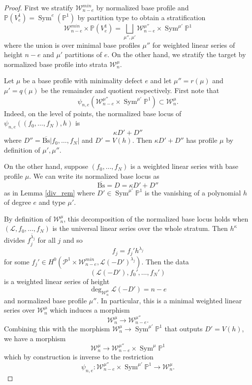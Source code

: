 \documentclass[a4paper,12pt]{amsart}
\theoremstyle{definition}
\newcommand{\bP}{\mathbb{P}}
\newcommand{\cL}{\mathcal{L}}
\newcommand{\cW}{\mathcal{W}}
\newcommand{\cP}{\mathcal{P}}
\DeclareMathOperator{\Sym}{Sym}
\begin{document}
	\begin{proof} First we stratify $\cW_{n-e}^{min}$ by normalized base profile and $\bP(V_e^1) = \Sym^e(\bP^1)$ by partition type to obtain a stratification 
		$$
		\cW_{n-e}^{min} \times \bP(V_e^1) = \bigsqcup_{\mu'',\mu'} \cW_{n-e}^{\mu''} \times \Sym^{\mu'}\bP^1
		$$
		where the union is over minimal base profiles $\mu''$ for weighted linear series of height $n-e$ and $\mu'$ partitions of $e$. On the other hand, we stratify the target by normalized base profile into strata $\cW_n^{\mu}$. 
		
		Let $\mu$ be a base profile with minimality defect $e$ and let $\mu'' = r(\mu)$ and $\mu' = q(\mu)$ be the remainder and quotient respectively. First note that 
		$$
		\psi_{n,e}(\cW_{n-e}^{\mu''} \times \Sym^{\mu'}\bP^1) \subset \cW^{\mu}_n. 
		$$
		Indeed, on the level of points, the normalized base locus of $\psi_{n,e}((f_0, \ldots,f_N),h)$ is
		$$
		\kappa D' + D''
		$$
		where $D'' = \overline{\mathrm{Bs}}|f_0, \ldots, f_N|$ and $D' = V(h)$. Then $\kappa D' + D''$ has profile $\mu$ by definition of $\mu', \mu''$.  
		
		On the other hand, suppose $(f_0, \ldots, f_N)$ is a weighted linear series with base profile $\mu$. We can write its normalized base locus as
		$$
		\overline{\mathrm{Bs}} = D = \kappa D' + D''
		$$
		as in Lemma \ref{div_rem} where $D' \in \Sym^{\mu'}\bP^1$ is the vanishing of a polynomial $h$ of degree $e$ and type $\mu'$. 
		
		By definition of $\cW^\mu_n$, this decomposition of the normalized base locus holds when $(\cL, f_0, \ldots, f_N)$ is the universal linear series over the whole stratum. Then $h^{\kappa}$ divides $f_j^{\bar{\lambda}_j}$ for all $j$ and so 
		$$
		f_j = f_j'h^{\lambda_j}
		$$
		for some $f_j' \in H^0(\cP^1 \times \cW^{min}_{n-e}, \cL(-D')^{\lambda_j})$. Then the data
		$$
		(\cL(-D'), f_0', \ldots, f_N')
		$$
		is a weighted linear series of height
		$$
		\deg_{\cW_n^\mu} \cL(-D') = n - e
		$$
		and normalized base profile $\mu''$. In particular, this is a minimal weighted linear series over $\cW_n^{\mu}$ which induces a morphism 
		$$
		\cW_n^{\mu} \to \cW_{n-e}^{\mu''}. 
		$$
		Combining this with the morphism $\cW_n^{\mu} \to \Sym^{\mu'}\bP^1$ that outputs $D' = V(h)$, we have a morphism 
		$$
		\cW_n^{\mu} \to \cW_{n-e}^{\mu''} \times \Sym^{\mu}\bP^1
		$$
		which by construction is inverse to the restriction
		$$
		\psi_{n,e} : \cW^{\mu''}_{n-e} \times \Sym^{\mu'}\bP^1 \to \cW_n^{\mu}. 
		$$
	\end{proof} 
	
\end{document}
